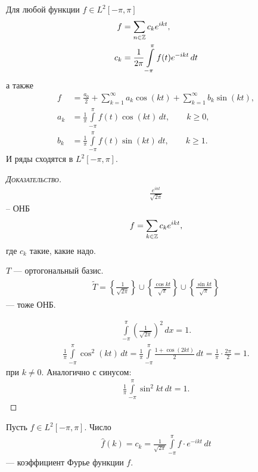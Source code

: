 \documentclass[../complex-analysis.tex]{subfiles}
\begin{document}
\begin{crly}
 Для любой функции $ f \in L^{2}[-\pi,\pi] $
 \begin{align*}
  f &= \sum_{n \in \mathbb{Z}} c_k e^{ikt}, \\
  c_k &= \frac{1}{2\pi} \int\limits_{-\pi}^{\pi} f(t)e^{-ikt}\,dt
 \end{align*}а также
 \begin{align*}
	 f &= \frac{a_0}{2}+ \sum_{k=1}^{\infty} a_k \cos(kt) + \sum_{k=1}^{\infty} b_k\sin(kt), \\
	 a_k &= \frac{1}{\pi} \int\limits_{-\pi}^{\pi} f(t)\cos(kt)\,dt, \qquad k \geqslant 0, \\
	 b_k &= \frac{1}{\pi} \int\limits_{-\pi}^{\pi} f(t)\sin(kt)\,dt, \qquad k \geqslant 1.
 \end{align*} И ряды сходятся в $ L^{2}[-\pi,\pi] $.
\end{crly}
\begin{proof}[\normalfont\textsc{Доказательство}]
 \begin{align*}
  \frac{e^{int}}{\sqrt{2\pi}}
 \end{align*} -- ОНБ
 \begin{align*}
  f = \sum_{k\in\mathbb{Z}} c_k e^{ikt},
 \end{align*} где $ c_k $ такие, какие надо.

 $ T $ --- ортогональный базис. 
 \begin{align*}
  \tilde T = \left\{ \frac{1}{\sqrt{2\pi}} \right\} \cup \left\{ \frac{\cos kt}{\sqrt \pi} \right\} \cup \left\{ \frac{\sin kt}{\sqrt \pi} \right\}
 \end{align*} --- тоже ОНБ.

 \begin{align*}
  \int\limits_{-\pi}^{\pi} \left( \frac{1}{\sqrt{2\pi}} \right)^{2}\,dx = 1.
 \end{align*}
 \begin{align*}
  \frac{1}{\pi} \int\limits_{-\pi}^{\pi} \cos^{2}(kt)\,dt = \frac{1}{\pi}\int\limits_{-\pi}^{\pi} \frac{1+\cos(2kt)}{2}\,dt = \frac{1}{\pi} \cdot \frac{2\pi}{2} = 1.
 \end{align*} при $ k \neq 0 $. Аналогично с синусом:
 \begin{align*}
  \frac{1}{\pi} \int\limits_{-\pi}^{\pi} \sin^{2}kt\,dt=1.
 \end{align*}
\end{proof}

\begin{df}
 Пусть $ f \in L^{2}[-\pi,\pi] $. Число
 \begin{align*}
  \hat f(k) = c_k = \frac{1}{\sqrt{2\pi}} \int\limits_{-\pi}^{\pi} f \cdot e^{-ikt}\,dt
 \end{align*} --- коэффициент Фурье функции $ f $.
\end{df}
\end{document}

